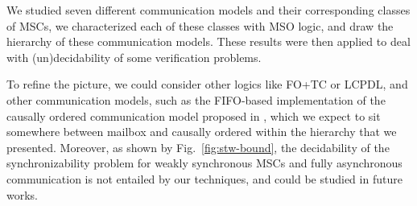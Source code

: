 

We studied seven different communication models
and their corresponding classes of MSCs, we characterized 
each of these classes with MSO logic, and draw the hierarchy of these communication models. These 
results were then applied to deal with (un)decidability of some 
verification problems. 

To refine the picture, we could
consider other logics like FO+TC or LCPDL, and other communication models, 
such as the FIFO-based implementation of the causally ordered 
communication model proposed in 
\cite{DBLP:conf/dagstuhl/MatternF94}, which we expect to sit somewhere between mailbox and causally ordered within the hierarchy that we presented. 
Moreover, as shown by Fig.~\ref{fig:stw-bound}, the 
decidability of the synchronizability problem for weakly 
synchronous MSCs and fully asynchronous communication is not entailed by our techniques, and could be studied in future works.

